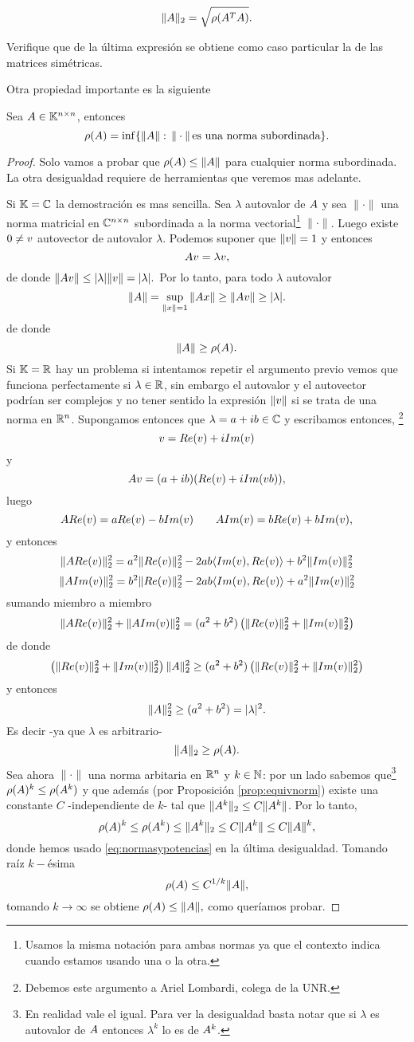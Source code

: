 $$
\|\Ab\|_2=\sqrt{\rho(\Ab^T\Ab)}.
$$
\etcc
\begin{ej}
 Verifique que de la última expresión se obtiene como caso particular la de las matrices simétricas.
\end{ej}
Otra propiedad importante es la siguiente
\begin{prop}
 \label{prop:infmat=rho}
Sea $\Ab\in\Knn$, entonces
$$
\rho(\Ab)=\inf
\{\|\Ab\|:\, \|\cdot \|\,  \mbox{es una norma subordinada}\}.$$
\end{prop}
\begin{proof}
Solo vamos a probar que  $\rho(\Ab)\le \|\Ab\|$ para cualquier norma subordinada. La otra desigualdad requiere de herramientas que veremos mas adelante.

 Si $\mathbb K=\mathbb C$ la demostración es mas sencilla.
 Sea $\lambda$ autovalor de $\Ab$ y sea $\|\cdot\|$ una norma matricial en $\mathbb C^{n\times n}$ subordinada a la norma vectorial\footnote{Usamos la misma notación para ambas normas ya que el contexto indica cuando estamos usando una o la otra.} $\|\cdot\|$. Luego existe $\cero\neq\vb$ autovector de autovalor $\lambda$. Podemos suponer que $\|\vb\|=1$ y entonces
 $$
 \Ab\vb=\lambda\vb,
 $$
 de donde
 $\|\Ab\vb\|\le |\lambda|\|\vb\|=|\lambda|.$ Por lo tanto, para todo $\lambda$ autovalor
 $$
 \|\Ab\|=\sup_{\|\xb\|=1}\|\Ab\xb\|\ge \|\Ab\vb\|\ge |\lambda|.
 $$
 de donde
 $$
 \|\Ab\|\ge \rho(\Ab).
 $$
 Si $\mathbb K=\mathbb R$ hay un problema si intentamos repetir el argumento previo vemos que funciona perfectamente si $\lambda \in \mathbb R$, sin embargo el autovalor y el autovector podrían ser complejos y no tener sentido la expresión $\|\vb\|$ si se trata de una norma en $\mathbb R^{n}$.
 Supongamos entonces que $\lambda=a+ib\in \mathbb C$ y escribamos entonces, \footnote{Debemos este argumento a Ariel Lombardi, colega de la UNR.}
$$
\vb=Re(\vb)+iIm(\vb)
$$
y
 $$
 \Ab\vb=(a+ib)(Re(\vb)+iIm(vb)),
 $$
 luego
 $$
 \Ab Re(\vb)=aRe(\vb)-bIm(\vb) \qquad
 \Ab Im(\vb)=bRe(\vb)+bIm(\vb),
 $$
 y entonces
 $$
 \|\Ab Re(\vb)\|_2^2=a^2\|Re(\vb)\|_2^2-2ab\langle Im(\vb),Re(\vb)\rangle+b^2\|Im(\vb)\|_2^2
 $$
 $$
 \|\Ab Im(\vb)\|_2^2=b^2\|Re(\vb)\|_2^2-2ab\langle Im(\vb),Re(\vb)\rangle+a^2\|Im(\vb)\|_2^2
 $$
 sumando miembro a miembro
 $$\|\Ab Re(\vb)\|_2^2+\|\Ab Im(\vb)\|_2^2=(a^2+b^2)\left(\|Re(\vb)\|_2^2+\|Im(\vb)\|_2^2\right)
 $$
 de donde
 $$
 \left(\|Re(\vb)\|_2^2+\|Im(\vb)\|_2^2\right)\|\Ab\|_2^2\ge (a^2+b^2)\left(\|Re(\vb)\|_2^2+\|Im(\vb)\|_2^2\right)
 $$
 y entonces
 $$
 \|\Ab\|_2^2\ge (a^2+b^2)=|\lambda|^2.
 $$
 Es decir -ya que $\lambda$ es arbitrario-
 $$\|\Ab\|_2\ge \rho(\Ab).$$
 Sea ahora $\|\cdot\|$ una norma arbitaria en $\mathbb R^{n}$ y $k\in \mathbb N$: por un lado sabemos que\footnote{En realidad vale el igual. Para ver la desigualdad basta notar que si $\lambda$ es autovalor de $ \Ab$ entonces $\lambda^k$ lo es de $\Ab^k$. }
 $\rho(\Ab)^k\le \rho(\Ab^k)
 $ y que además (por Proposición \ref{prop:equivnorm}) existe una constante $C$ -independiente de $k$- tal que $\|\Ab^k\|_2\le C\|\Ab^k\|$. Por lo tanto,
 $$
 \rho(\Ab)^k\le \rho(\Ab^k)\le \|\Ab^k\|_2\le C\|\Ab^k\|\le C\|\Ab\|^k,
 $$
 donde hemos usado \eqref{eq:normasypotencias} en la última desigualdad. Tomando raíz $k-$ésima
 $$
 \rho(\Ab)\le C^{1/k}\|\Ab\|,
 $$
 tomando $k\to \infty$ se obtiene $
 \rho(\Ab)\le \|\Ab\|,
 $
 como queríamos probar.
\end{proof}
